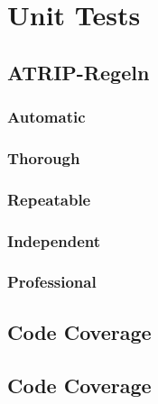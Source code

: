 \chapter{Unit Tests}

\section{ATRIP-Regeln}

\subsection{Automatic}

\subsection{Thorough}

\subsection{Repeatable}

\subsection{Independent}

\subsection{Professional}

\section{Code Coverage}

\section{Code Coverage}